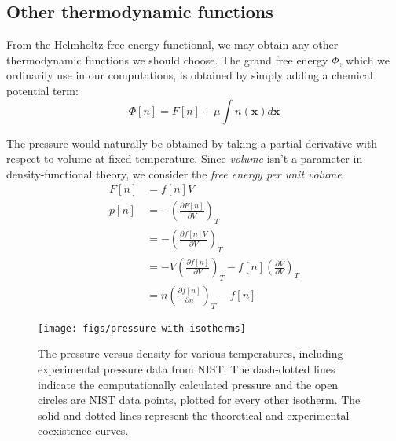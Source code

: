 \documentclass[letterpaper,twocolumn,amsmath,amssymb,prb]{revtex4-1}
\newcommand{\xx}{\textbf{x}}
\begin{document}

\subsection{Other thermodynamic functions}

From the Helmholtz free energy functional, we may obtain any other
thermodynamic functions we should choose.  The grand free energy
$\Phi$, which we ordinarily use in our computations, is obtained by
simply adding a chemical potential term:
\begin{equation}
  \Phi[n] = F[n] + \mu \int n(\xx) d\xx
\end{equation}

The pressure would naturally be obtained by taking a partial
derivative with respect to volume at fixed temperature.  Since
\emph{volume} isn't a parameter in density-functional theory, we
consider the \emph{free energy per unit volume}.
\begin{align}
  F[n] &= f[n]V \\
  p[n] &= -\left(\frac{\partial F[n]}{\partial V}\right)_{T} \\
  &= -\left(\frac{\partial f[n]V}{\partial V}\right)_{T} \\
  &= -V\left(\frac{\partial f[n]}{\partial V}\right)_{T}
   - f[n]\left(\frac{\partial V}{\partial V}\right)_{T} \\
  &= n \left(\frac{\partial f[n]}{\partial n}\right)_{T} - f[n]
\end{align}

\begin{figure}
\begin{center}
\texttt{[image: figs/pressure-with-isotherms]}
\end{center}
\caption{The pressure versus density for various temperatures, including
experimental pressure data from NIST\cite{nistwater}. The dash-dotted lines
indicate the computationally calculated pressure and the open circles are 
NIST data points, plotted for every other isotherm. The solid and dotted lines
represent the theoretical and experimental coexistence curves.}
\label{fig:pressure-with-isotherms}
\end{figure}
\end{document}
